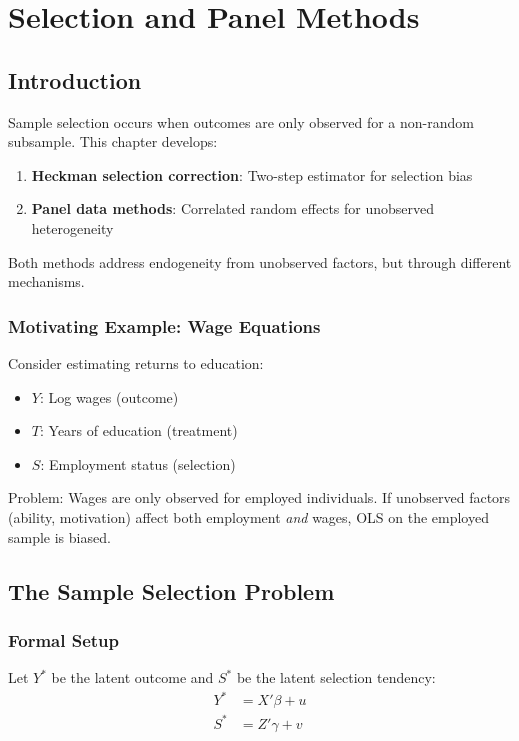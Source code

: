 \chapter{Selection and Panel Methods}
\label{ch:selection-panel}

\section{Introduction}

Sample selection occurs when outcomes are only observed for a non-random subsample. This chapter develops:
\begin{enumerate}
\item \textbf{Heckman selection correction}: Two-step estimator for selection bias
\item \textbf{Panel data methods}: Correlated random effects for unobserved heterogeneity
\end{enumerate}

Both methods address endogeneity from unobserved factors, but through different mechanisms.

\subsection{Motivating Example: Wage Equations}

Consider estimating returns to education:
\begin{itemize}
\item $Y$: Log wages (outcome)
\item $T$: Years of education (treatment)
\item $S$: Employment status (selection)
\end{itemize}

Problem: Wages are only observed for employed individuals. If unobserved factors (ability, motivation) affect both employment \textit{and} wages, OLS on the employed sample is biased.


\section{The Sample Selection Problem}

\subsection{Formal Setup}

Let $Y^*$ be the latent outcome and $S^*$ be the latent selection tendency:
\begin{align}
Y^* &= X'\beta + u \label{eq:outcome-latent}\\
S^* &= Z'\gamma + v \label{eq:selection-latent}
\end{align}

